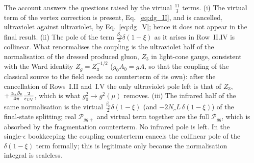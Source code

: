 The account answers the questions raised by the virtual $\frac{11}{3}$ terms. (i) The virtual term of the vertex correction is present, Eq.~\eqref{eq:dg_II}, and is cancelled, ultraviolet against ultraviolet, by Eq.~\eqref{eq:dg_V}; hence it does not appear in the final result. (ii) The pole of the term $\frac{\beta_0}{2}\delta(1-\xi)$ as it arises in Row~II.IV is collinear. What renormalises the coupling is the ultraviolet half of the normalisation of the dressed produced gluon, $Z_3$ in light-cone gauge, consistent with the Ward identity $Z_g=Z_3^{-1/2}$ ($g_0A_0=gA$, so that the coupling of the classical source to the field needs no counterterm of its own): after the cancellation of Rows~I.II and~I.V the only ultraviolet pole left is that of $Z_3$, $+\frac{\alpha_s\beta_0}{4\pi}\frac{2}{\epsilon_{\rm UV}}$, which is what $g_0^2\to g^2(\mu)$ removes. (iii) The infrared half of the same normalisation is the virtual $\frac{\beta_0}{2}\delta(1-\xi)$ (and $-2N_cL\,\delta(1-\xi)$) of the final-state splitting; real $\mathcal P_{gg+}$ and virtual term together are the full $\mathcal P_{gg}$, which is absorbed by the fragmentation counterterm. No infrared pole is left. In the single-$\epsilon$ bookkeeping the coupling counterterm cancels the collinear pole of the $\delta(1-\xi)$ term formally; this is legitimate only because the normalisation integral is scaleless.

